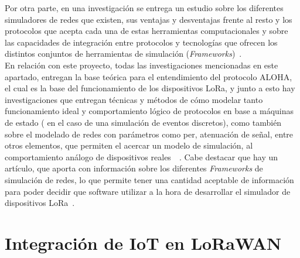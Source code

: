 \begin{justify}
Por otra parte, en una investigación se entrega un estudio sobre los diferentes simuladores de redes que existen, sus ventajas y desventajas frente al resto y los protocolos que acepta cada una de estas herramientas computacionales y sobre las capacidades de integración entre protocolos y tecnologías que ofrecen los distintos conjuntos de herramientas de simulación (\textit{Frameworks})~\cite{Murat}.\\
En relación con este proyecto, todas las investigaciones mencionadas en este apartado, entregan la base teórica para el entendimiento del protocolo ALOHA, el cual es la base del funcionamiento de los dispositivos LoRa, y junto a esto hay investigaciones que entregan técnicas y métodos de cómo modelar tanto funcionamiento ideal y comportamiento lógico de protocolos en base a máquinas de estado ( en el caso de una simulación de eventos discretos), como también sobre el modelado de redes con parámetros como \gls{per}, atenuación de señal, entre otros elementos, que permiten el acercar un modelo de simulación, al comportamiento análogo de dispositivos reales~\cite{Abdullah}~\cite{simulato}. Cabe destacar que hay un artículo, que aporta con información sobre los diferentes \textit{Frameworks} de simulación de redes, lo que permite tener una cantidad aceptable de información para poder decidir que software utilizar a la hora de desarrollar el simulador de dispositivos LoRa~\cite{Murat}.

\section{Integración de IoT en LoRaWAN}


\end{justify}
